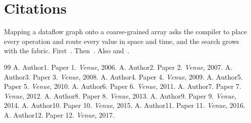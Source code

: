 \documentclass{article}
\begin{document}
\section{Citations}
Mapping a dataflow graph onto a coarse-grained array asks the compiler to place every operation and route every value in space and time, and the search grows with the fabric. First~\cite{k01,k02,k03}. Then~\citep{k04,k05}. Also \citet{k06} and~\cite{k07,k08,k09,k10}.

\begin{thebibliography}{99}
 A. Author1. Paper 1. \emph{Venue}, 2006.
 A. Author2. Paper 2. \emph{Venue}, 2007.
 A. Author3. Paper 3. \emph{Venue}, 2008.
 A. Author4. Paper 4. \emph{Venue}, 2009.
 A. Author5. Paper 5. \emph{Venue}, 2010.
 A. Author6. Paper 6. \emph{Venue}, 2011.
 A. Author7. Paper 7. \emph{Venue}, 2012.
 A. Author8. Paper 8. \emph{Venue}, 2013.
 A. Author9. Paper 9. \emph{Venue}, 2014.
 A. Author10. Paper 10. \emph{Venue}, 2015.
 A. Author11. Paper 11. \emph{Venue}, 2016.
 A. Author12. Paper 12. \emph{Venue}, 2017.
\end{thebibliography}
\end{document}
